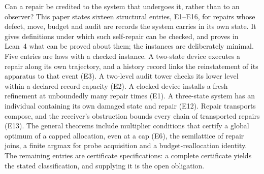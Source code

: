 Can a repair be credited to the system that undergoes it, rather than to an observer? This paper
states sixteen structural entries, E1--E16, for repairs whose defect, move, budget and audit are
records the system carries in its own state. It gives definitions under which such self-repair can be
checked, and proves in Lean~4 what can be proved about them; the instances are deliberately minimal.
Five entries are laws with a checked instance. A two-state device executes a repair along its own
trajectory, and a history record links the reinstatement of its apparatus to that event (E3). A
two-level audit tower checks its lower level within a declared record capacity (E2). A clocked
device installs a fresh refinement at unboundedly many repair times (E1). A three-state system has
an individual containing its own damaged state and repair (E12).
Repair transports compose, and the
receiver's obstruction bounds every chain of transported repairs (E13). The general theorems include
multiplier conditions that certify a global optimum of a capped allocation, even at a cap (E6), the
semilattice of repair joins, a finite argmax for probe acquisition and a budget-reallocation
identity. The remaining entries are certificate specifications: a complete certificate yields the
stated classification, and supplying it is the open obligation.
